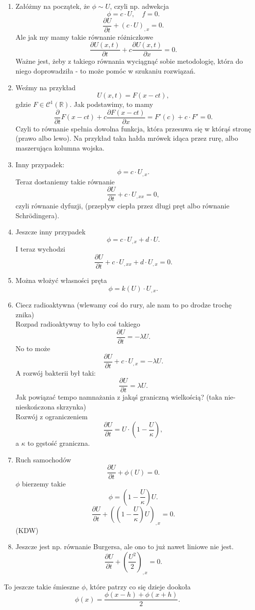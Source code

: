 \documentclass[../main.tex]{subfiles}
\begin{document}
\begin{enumerate}
    \item Załóżmy na początek, że $\phi \sim U$, czyli np. adwekcja
\[
    \phi = c \cdot U,\quad f = 0
.\]
\[
    \frac{\partial U}{\partial t} + (c \cdot U)_{,x} = 0
.\]
Ale jak my mamy takie równanie różniczkowe
\[
    \frac{\partial U(x,t)}{\partial t} + c \frac{\partial U(x,t)}{\partial x} = 0
.\]
Ważne jest, żeby z takiego równania wyciągnąć sobie metodologię, która do niego doprowadziła - to może pomóc w szukaniu rozwiązań.\\
    \item Weźmy na przykład
\[
    U(x,t) = F(x - ct)
,\]
gdzie $F\in \mathcal{C}^1(\mathbb{R})$. Jak podstawimy, to mamy
\[
    \frac{\partial }{\partial t} F(x-ct) + c \frac{\partial F(x-ct)}{\partial x} = F'(c) + c \cdot F' = 0
.\]
Czyli to równanie spełnia dowolna funkcja, która przesuwa się w którąś stronę (prawo albo lewo). Na przykład taka hałda mrówek idąca przez rurę, albo maszerująca kolumna wojska.

\item Inny przypadek:
\[
    \phi = c \cdot U_{,x}
.\]
Teraz dostaniemy takie równanie
\[
    \frac{\partial U}{\partial t} + c \cdot U_{,x x} =0
,\]
czyli równanie dyfuzji, (przepływ ciepła przez długi pręt albo równanie Schrödingera).

\item Jeszcze inny przypadek
\[
    \phi = c \cdot U_{,x} + d \cdot U
.\]
I teraz wychodzi
\[
    \frac{\partial U}{\partial t} + c \cdot U_{,xx} + d \cdot U_{,x} = 0
.\]

\item Można włożyć własności pręta
\[
    \phi = k(U) \cdot U_{,x}
.\]
\item Ciecz radioaktywna (wlewamy coś do rury, ale nam to po drodze trochę znika)\\
    Rozpad radioaktywny to było coś takiego
        \[
            \frac{\partial U}{\partial t} = -\lambda U
        .\]
    No to może
        \[
            \frac{\partial U}{\partial t} + c \cdot U_{,x} = -\lambda U
        .\]
    A rozwój bakterii był taki:
        \[
            \frac{\partial U}{\partial t} = \lambda U
        .\]
    Jak powiązać tempo namnażania z jakąś graniczną wielkością? (taka nie-nieskończona skrzynka)\\
Rozwój z ograniczeniem
    \[
        \frac{\partial U}{\partial t} = U \cdot \left( 1 - \frac{U}{\kappa} \right)
    ,\]
a $\kappa$ to gęstość graniczna.
\item Ruch samochodów
    \[
        \frac{\partial U}{\partial t} + \phi(U) = 0
    .\]
$\phi$ bierzemy takie
\[
    \phi = \left(1 - \frac{U}{\kappa}\right) U
.\]
\[
    \frac{\partial U}{\partial t} + \left( \left( 1 - \frac{U}{\kappa} \right) U \right)_{,x} = 0
.\]
(KDW)
\item Jeszcze jest np. równanie Burgersa, ale ono to już nawet liniowe nie jest.
    \[
        \frac{\partial U}{\partial t} + \left( \frac{U^2}{2} \right) _{,x} = 0
.\]
\end{enumerate}
To jeszcze takie śmieszne $\phi$, które patrzy co się dzieje dookoła
\[
    \phi(x) = \frac{\phi(x-h) + \phi(x+h)}{2}
.\]
\end{document}
